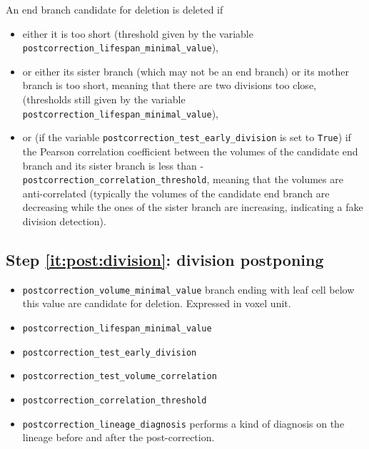 An end branch candidate for deletion is deleted if
\begin{itemize}
\itemsep -0.5ex
\item either it is too short (threshold given by the variable \texttt{postcorrection\_lifespan\_minimal\_value}),
\item or either its sister branch (which may not be an end branch) or its mother branch is too short, meaning that there are two divisions too close, (thresholds still given by the variable \texttt{postcorrection\_lifespan\_minimal\_value}),
\item or (if the variable \texttt{postcorrection\_test\_early\_division} is set to \texttt{True}) if the Pearson correlation coefficient between the volumes of the candidate end branch and its sister branch is less than 
-\texttt{postcorrection\_correlation\_threshold}, meaning that the volumes are anti-correlated (typically the volumes of the candidate end branch are decreasing while the ones of the sister branch are increasing, indicating a fake division detection).
\end{itemize}

\subsection{Step \ref{it:post:division}: division postponing}

      
\begin{itemize}
\itemsep -0.5ex
\item \texttt{postcorrection\_volume\_minimal\_value}
  branch ending with leaf cell below this value are candidate for deletion. Expressed in voxel unit.
\item \texttt{postcorrection\_lifespan\_minimal\_value}
\item \texttt{postcorrection\_test\_early\_division}
\item \texttt{postcorrection\_test\_volume\_correlation}
\item \texttt{postcorrection\_correlation\_threshold}
\item \texttt{postcorrection\_lineage\_diagnosis}
  performs a kind of diagnosis on the lineage before and after the post-correction.
\end{itemize}






